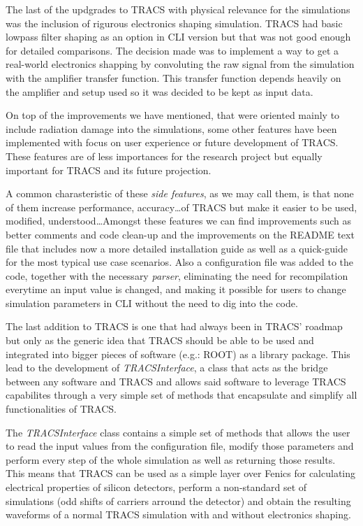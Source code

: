 The last of the updgrades to TRACS with physical relevance for the simulations was the inclusion of rigurous electronics shaping simulation. TRACS had basic lowpass filter shaping as an option in CLI version but that was not good enough for detailed comparisons. The decision made was to implement a way to get a real-world electronics shapping by convoluting the raw signal from the simulation with the amplifier transfer function. This transfer function depends heavily on the amplifier and setup used so it was decided to be kept as input data.

On top of the improvements we have mentioned, that were oriented mainly to include radiation damage into the simulations, some other features have been implemented with focus on user experience or future development of TRACS. These features are of less importances for the research project but equally important for TRACS and its future projection. 

A common charasteristic of these \textit{side features}, as we may call them, is that none of them increase performance, accuracy\ldots of TRACS but make it easier to be used, modified, understood\ldots Amongst these features we can find improvements such as better comments and code clean-up and the improvements on the README text file that includes now a more detailed installation guide as well as a quick-guide for the most typical use case scenarios.  Also a configuration file was added to the code, together with the necessary \textit{parser}, eliminating the need for recompilation everytime an input value is changed, and making it possible for users to change simulation parameters in CLI without the need to dig into the code. 

The last addition to TRACS is one that had always been in TRACS' roadmap but only as the generic idea that TRACS should be able to be used and integrated into bigger pieces of software (e.g.: ROOT) as a library package. This lead to the development of \textit{TRACSInterface}, a class that acts as the bridge between any software and TRACS and allows said software to leverage TRACS capabilites through a very simple set of methods that encapsulate and simplify all functionalities of TRACS.

The \textit{TRACSInterface} class contains a simple set of methods that allows the user to read the input values from the configuration file, modify those parameters and perform every step of the whole simulation as well as returning those results. This means that TRACS can be used as a simple layer over Fenics for calculating electrical properties of silicon detectors, perform a non-standard set of simulations (odd shifts of carriers arround the detector) and obtain the resulting waveforms of a normal TRACS simulation with and without electronics shaping.

